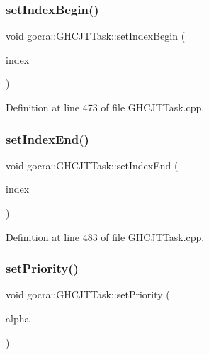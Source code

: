 \subsubsection{\texorpdfstring{set\+Index\+Begin()}{setIndexBegin()}}
{\footnotesize\ttfamily void gocra\+::\+G\+H\+C\+J\+T\+Task\+::set\+Index\+Begin (\begin{DoxyParamCaption}\item[{int}]{index }\end{DoxyParamCaption})}



Definition at line 473 of file G\+H\+C\+J\+T\+Task.\+cpp.

\hypertarget{classgocra_1_1GHCJTTask_a26739b301ace2b23b7217f5aa18afd5e}{}\label{classgocra_1_1GHCJTTask_a26739b301ace2b23b7217f5aa18afd5e} 
\subsubsection{\texorpdfstring{set\+Index\+End()}{setIndexEnd()}}
{\footnotesize\ttfamily void gocra\+::\+G\+H\+C\+J\+T\+Task\+::set\+Index\+End (\begin{DoxyParamCaption}\item[{int}]{index }\end{DoxyParamCaption})}



Definition at line 483 of file G\+H\+C\+J\+T\+Task.\+cpp.

\hypertarget{classgocra_1_1GHCJTTask_a5dce074858a320d3277eb5e0c8fc1d0c}{}\label{classgocra_1_1GHCJTTask_a5dce074858a320d3277eb5e0c8fc1d0c} 
\subsubsection{\texorpdfstring{set\+Priority()}{setPriority()}}
{\footnotesize\ttfamily void gocra\+::\+G\+H\+C\+J\+T\+Task\+::set\+Priority (\begin{DoxyParamCaption}\item[{Eigen\+::\+Matrix\+Xd \&}]{alpha }\end{DoxyParamCaption})}



